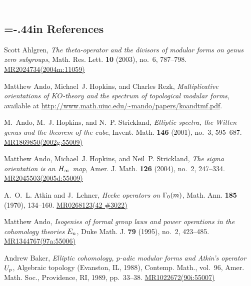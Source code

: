 \documentclass{gtpart}
\theoremstyle{definition}
\theoremstyle{remark}
\renewcommand{\=}{\approx}
\renewcommand{\-}{\sim}
\newcommand{\wt}[1]{\textcolor{white}{#1} \!~}
\numberwithin{equation}{section}
\numberwithin{thm}{section}
\begin{document}
% 
% 

\newpage
\renewcommand\refname{}
\newcommand{\AX}[1]{\href{http://arxiv.org/abs/#1}{arXiv:#1}}
\newcommand{\MRn}[2]{\href{http://www.ams.org/mathscinet-getitem?mr=#1}{MR#1#2}}
\newcommand{\name}{TateNormalLevelResolutions.pdf}
\wt{.}\vspace{-1.04in}
\begin{thebibliography}

\section*{\leftskip=-.44in References \vspace{.17in}}

Scott Ahlgren, \emph{The theta-operator and the divisors of modular forms on
  genus zero subgroups}, Math. Res. Lett. \textbf{10} (2003), no.~6,
  787--798. \MRn{2024734}{(2004m:11059)}

Matthew Ando, Michael~J. Hopkins, and Charles Rezk, \emph{Multiplicative
  orientations of {$KO$}-theory and the spectrum of topological modular forms}, 
  available at \href{http://www.math.uiuc.edu/~mando/papers/koandtmf.pdf}
  {http://www.math.uiuc.edu/\textasciitilde mando/papers/koandtmf.pdf}.

M.~Ando, M.~J. Hopkins, and N.~P. Strickland, \emph{Elliptic spectra, the
  {W}itten genus and the theorem of the cube}, Invent. Math. \textbf{146}
  (2001), no.~3, 595--687. \MRn{1869850}{(2002g:55009)}

Matthew Ando, Michael~J. Hopkins, and Neil~P. Strickland, \emph{The sigma
  orientation is an {$H\sb \infty$} map}, Amer. J. Math. \textbf{126} (2004),
  no.~2, 247--334. \MRn{2045503}{(2005d:55009)}

A.~O.~L. Atkin and J.~Lehner, \emph{Hecke operators on {$\Gamma \sb{0}(m)$}},
  Math. Ann. \textbf{185} (1970), 134--160. \MRn{0268123}{(42 \#3022)}

Matthew Ando, \emph{Isogenies of formal group laws and power operations in the
  cohomology theories {$E\sb n$}}, Duke Math. J. \textbf{79} (1995), no.~2,
  423--485. \MRn{1344767}{(97a:55006)}

Andrew Baker, \emph{Elliptic cohomology, {$p$}-adic modular forms and {A}tkin's
  operator {$U\sb p$}}, Algebraic topology ({E}vanston, {IL}, 1988), Contemp.
  Math., vol.~96, Amer. Math. Soc., Providence, RI, 1989, pp.~33--38.
  \MRn{1022672}{(90i:55007)}


\end{thebibliography}
\end{document}

